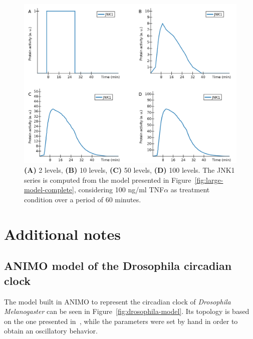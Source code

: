 \documentclass{bmcart}
\begin{document}
\begin{figure}[htpb]
\begin{minipage}{\textwidth}
\centering
\includegraphics[width=\textwidth]{images/JNK1_levels}
\caption{
{\bf(A)} 2 levels,
{\bf(B)} 10 levels,
{\bf (C)} 50 levels,
{\bf (D)} 100 levels.
The {\sf JNK1} series is computed from the model presented in Figure~\ref{fig:large-model-complete},
considering 100 ng/ml TNF$\alpha$ as treatment condition over a period of 60 minutes.}\label{fig:levels}
\end{minipage}
\end{figure}



\clearpage
\section{Additional notes}

\subsection{ANIMO model of the Drosophila circadian clock}
The model built in ANIMO to represent the circadian clock of \emph{Drosophila Melanogaster}
can be seen in Figure~\ref{fig:drosophila-model}. Its topology is based on the one presented
in~\cite{drosophila-ode-model}, while the parameters were set by hand in order to obtain
an oscillatory behavior.
\end{document}
